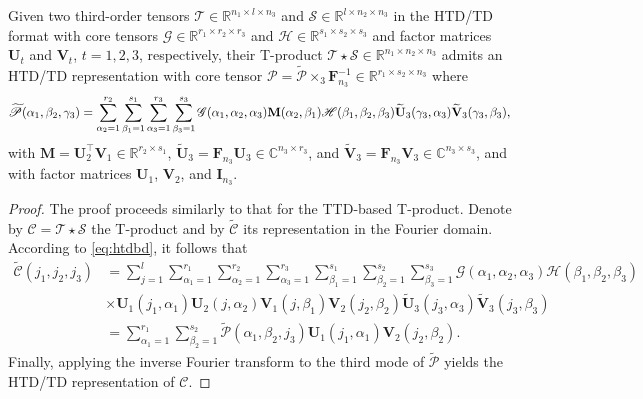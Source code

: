 \documentclass[onefignum,onetabnum]{siamart250211}
\begin{document}
\begin{proposition}\label{prop:htdtd_tprod}
Given two third-order tensors 
$\mathscr{T}\in\mathbb{R}^{n_1\times l\times n_3}$ and
$\mathscr{S}\in\mathbb{R}^{l\times n_2\times n_3}$ in the HTD/TD format with core tensors $\mathscr{G}\in\mathbb{R}^{r_1\times r_2\times r_3}$ and $\mathscr{H}\in\mathbb{R}^{s_1\times s_2\times s_3}$ and factor matrices $\textbf{U}_t$ and $\textbf{V}_t$, $t=1,2,3$, respectively, their T-product $\mathscr{T}\star\mathscr{S}\in\mathbb{R}^{n_1\times n_2\times n_3}$ admits an HTD/TD representation with core tensor $\mathscr{P} = \widetilde{\mathscr{P}} \times_3\textbf{F}_{n_3}^{-1}\in\mathbb{R}^{r_1\times s_2\times n_3}$ where
\begin{equation*}
\scalebox{0.92}{$\displaystyle
\widetilde{\mathscr{P}}(\alpha_1,\beta_2,\gamma_3)
=
\sum_{\alpha_2=1}^{r_2}
\sum_{\beta_1=1}^{s_1}
\sum_{\alpha_3=1}^{r_3}
\sum_{\beta_3=1}^{s_3}
\mathscr{G}(\alpha_1,\alpha_2,\alpha_3)
\textbf{M}(\alpha_2,\beta_1)
\mathscr{H}(\beta_1,\beta_2,\beta_3) 
\widetilde{\textbf{U}}_3(\gamma_3,\alpha_3)
\widetilde{\textbf{V}}_3(\gamma_3,\beta_3),$}
\end{equation*}
with $\textbf{M}=\textbf{U}_{2}^\top\textbf{V}_{1}
\in\mathbb{R}^{r_2\times s_1}$,  $\widetilde{\textbf{U}}_3=\textbf{F}_{n_3}\textbf{U}_3\in\mathbb{C}^{n_3\times r_3}$, and $\widetilde{\textbf{V}}_3=\textbf{F}_{n_3}\textbf{V}_3\in\mathbb{C}^{n_3\times s_3}$, and with factor matrices $\textbf{U}_1$, $\textbf{V}_2$, and $\textbf{I}_{n_3}$. 
\end{proposition}
\begin{proof}
The proof proceeds similarly to that for the TTD-based T-product.
    Denote by $\mathscr{C}=\mathscr{T}\star\mathscr{S}$  the T-product and by $\widetilde{\mathscr{C}}$  its representation in the Fourier domain. According to \eqref{eq:htdbd}, it follows that
    \begin{align*}
        \widetilde{\mathscr{C}}(j_1,j_2,j_3) &= \sum_{j=1}^{l}
\sum_{\alpha_1=1}^{r_1}
\sum_{\alpha_2=1}^{r_2}
\sum_{\alpha_3=1}^{r_3}
\sum_{\beta_1=1}^{s_1}
\sum_{\beta_2=1}^{s_2}
\sum_{\beta_3=1}^{s_3}
\mathscr{G}(\alpha_1,\alpha_2,\alpha_3)
\mathscr{H}(\beta_1,\beta_2,\beta_3)\\
&\times \textbf{U}_1(j_1,\alpha_1)
\textbf{U}_2(j,\alpha_2)
\textbf{V}_1(j,\beta_1)
\textbf{V}_2(j_2,\beta_2)\widetilde{\textbf{U}}_3(j_3,\alpha_3)
\widetilde{\textbf{V}}_3(j_3,\beta_3)\\
& = \sum_{\alpha_1=1}^{r_1}
\sum_{\beta_2=1}^{s_2}\widetilde{\mathscr{P}}(\alpha_1,\beta_2,j_3)
\textbf{U}_{1}(j_1,\alpha_1)
\textbf{V}_{2}(j_2,\beta_2).
    \end{align*}
Finally, applying the inverse Fourier transform to the third mode of $\widetilde{\mathscr{P}}$ yields the HTD/TD representation of $\mathscr{C}$.
\end{proof}
\end{document}

